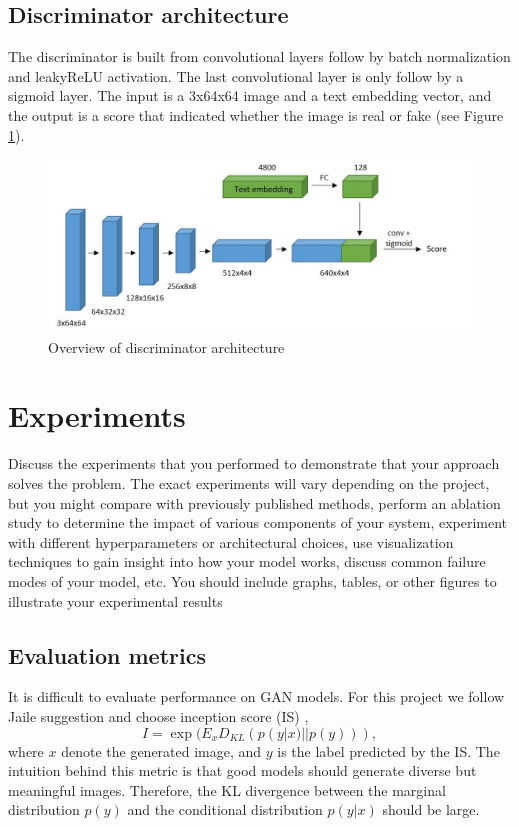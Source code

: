 \documentclass[a4paper]{article}
\begin{document}
\subsection{Discriminator architecture}
The discriminator is built from convolutional layers follow by batch normalization and leakyReLU activation. The last convolutional layer is only follow by a sigmoid layer. The input is a 3x64x64 image and a text embedding vector, and the output is a score that indicated whether the image is real or fake (see Figure \ref{fig:Disc}).

 \begin{figure}[ht]
    \centering
    \includegraphics[width=\textwidth]{disc.jpg}
    \caption{Overview of discriminator architecture}
    \label{fig:Disc}
\end{figure}


\section{Experiments}
Discuss the experiments that you performed to
demonstrate that your approach solves the problem. The exact
experiments will vary depending on the project, but you might compare
with previously published methods, perform an ablation study to
determine the impact of various components of your system, experiment
with different hyperparameters or architectural choices, use visualization
techniques to gain insight into how your model works, discuss common
failure modes of your model, etc. You should include graphs, tables, or
other figures to illustrate your experimental results

\subsection{Evaluation metrics}
It is difficult to evaluate performance on GAN models. For this project we follow Jaile suggestion and choose inception score (IS) \cite{salimans2016improved},
\begin{equation}
    I = \exp({E_x D_{KL} (p(y|x)||p(y)))}, 
\end{equation}
where $x$ denote the generated image, and $y$ is the label predicted by the IS. The intuition behind this metric  is that good models should generate diverse but meaningful images. Therefore, the KL divergence between the marginal distribution $p(y)$ and the conditional distribution $p(y|x)$ should be large.
\end{document}
